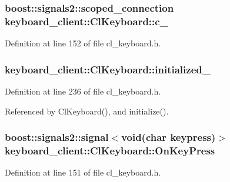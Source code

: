 \subsubsection[{\texorpdfstring{c\+\_\+}{c_}}]{\setlength{\rightskip}{0pt plus 5cm}boost\+::signals2\+::scoped\+\_\+connection keyboard\+\_\+client\+::\+Cl\+Keyboard\+::c\+\_\+}\hypertarget{classkeyboard__client_1_1ClKeyboard_a32d0c1c037454900708b58b709767e56}{}\label{classkeyboard__client_1_1ClKeyboard_a32d0c1c037454900708b58b709767e56}


Definition at line 152 of file cl\+\_\+keyboard.\+h.

\subsubsection[{\texorpdfstring{initialized\+\_\+}{initialized_}}]{ keyboard\+\_\+client\+::\+Cl\+Keyboard\+::initialized\+\_\+\hspace{0.3cm}{\ttfamily [private]}}\hypertarget{classkeyboard__client_1_1ClKeyboard_aff74d4f212f4846a1f7cc6c0e4d5f728}{}\label{classkeyboard__client_1_1ClKeyboard_aff74d4f212f4846a1f7cc6c0e4d5f728}


Definition at line 236 of file cl\+\_\+keyboard.\+h.



Referenced by Cl\+Keyboard(), and initialize().

\subsubsection[{\texorpdfstring{On\+Key\+Press}{OnKeyPress}}]{\setlength{\rightskip}{0pt plus 5cm}boost\+::signals2\+::signal$<$void(char keypress)$>$ keyboard\+\_\+client\+::\+Cl\+Keyboard\+::\+On\+Key\+Press}\hypertarget{classkeyboard__client_1_1ClKeyboard_a771589b55252145020691bfb6ec47adf}{}\label{classkeyboard__client_1_1ClKeyboard_a771589b55252145020691bfb6ec47adf}


Definition at line 151 of file cl\+\_\+keyboard.\+h.



